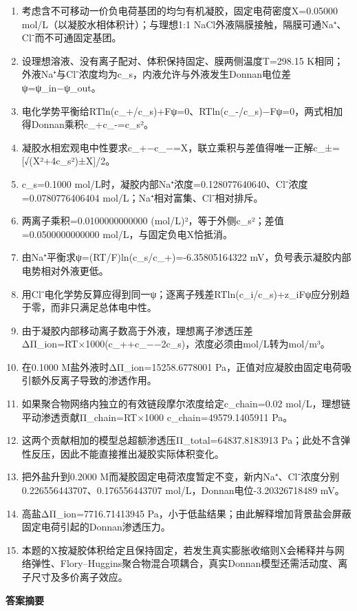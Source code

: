 \documentclass[UTF8,11pt,a4paper]{ctexart}
\begin{document}
\begin{enumerate}
\item 考虑含不可移动一价负电荷基团的均匀有机凝胶，固定电荷密度X=0.05000 mol/L（以凝胶水相体积计）；与理想1:1 NaCl外液隔膜接触，隔膜可通Na⁺、Cl⁻而不可通固定基团。
\item 设理想溶液、没有离子配对、体积保持固定、膜两侧温度T=298.15 K相同；外液Na⁺与Cl⁻浓度均为c\_s，内液允许与外液发生Donnan电位差ψ=ψ\_in−ψ\_out。
\item 电化学势平衡给RTln(c\_+/c\_s)+Fψ=0、RTln(c\_-/c\_s)−Fψ=0，两式相加得Donnan乘积c\_+c\_-=c\_s²。
\item 凝胶水相宏观电中性要求c\_+−c\_−=X，联立乘积与差值得唯一正解c\_±=[√(X²+4c\_s²)±X]/2。
\item c\_s=0.1000 mol/L时，凝胶内部Na⁺浓度=0.128077640640、Cl⁻浓度=0.0780776406404 mol/L；Na⁺相对富集、Cl⁻相对排斥。
\item 两离子乘积=0.0100000000000 (mol/L)²，等于外侧c\_s²；差值=0.0500000000000 mol/L，与固定负电X恰抵消。
\item 由Na⁺平衡求ψ=(RT/F)ln(c\_s/c\_+)=-6.35805164322 mV，负号表示凝胶内部电势相对外液更低。
\item 用Cl⁻电化学势反算应得到同一ψ；逐离子残差RTln(c\_i/c\_s)+z\_iFψ应分别趋于零，而非只满足总体电中性。
\item 由于凝胶内部移动离子数高于外液，理想离子渗透压差ΔΠ\_ion=RT×1000(c\_++c\_−−2c\_s)，浓度必须由mol/L转为mol/m³。
\item 在0.1000 M盐外液时ΔΠ\_ion=15258.6778001 Pa，正值对应凝胶由固定电荷吸引额外反离子导致的渗透作用。
\item 如果聚合物网络内独立的有效链段摩尔浓度给定c\_chain=0.02 mol/L，理想链平动渗透贡献Π\_chain=RT×1000 c\_chain=49579.1405911 Pa。
\item 这两个贡献相加的模型总超额渗透压Π\_total=64837.8183913 Pa；此处不含弹性反压，因此不能直接推出凝胶实际体积变化。
\item 把外盐升到0.2000 M而凝胶固定电荷浓度暂定不变，新内Na⁺、Cl⁻浓度分别0.226556443707、0.176556443707 mol/L，Donnan电位-3.20326718489 mV。
\item 高盐ΔΠ\_ion=7716.71413945 Pa，小于低盐结果；由此解释增加背景盐会屏蔽固定电荷引起的Donnan渗透压力。
\item 本题的X按凝胶体积给定且保持固定，若发生真实膨胀收缩则X会稀释并与网络弹性、Flory–Huggins聚合物混合项耦合，真实Donnan模型还需活动度、离子尺寸及多价离子效应。
\end{enumerate}
\noindent\textbf{答案摘要}\par
\end{document}
